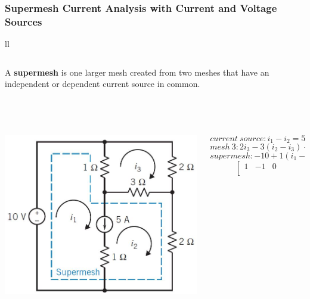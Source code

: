 \documentclass[aspectratio=169]{beamer}
\begin{document}
\begin{frame}[fragile]

\frametitle{Supermesh Current Analysis with Current and Voltage Sources}
\begin{tabular}{ll}
	\begin{columns}[c]	\column{1\textwidth}
		A \textbf{supermesh} is one larger mesh created from two meshes that have an independent or dependent current source in common.
	\end{columns} \\
	\begin{columns}
		\begin{column}{0.3\textwidth}  %
		\includegraphics[width=1.2\textwidth]{figura4_64.JPG}\\	
		\end{column}
		\begin{column}{0.7\textwidth}  %
			\begin{equation}
			current \ source: i_{1}- i_{2}=5
			\end{equation}
			\begin{equation}
			mesh \ 3: 2i_{3}-3(i_{2}-i_{3})-1(i_{1}-i_{3})=0
			\end{equation}
			\begin{equation}
			supermesh: -10 +1(i_{1}-i_{3})+3(i_{2}-i_{3})+2i_{2}=0
			\end{equation}
				\[ 
			\left[\begin{array}{rrr}
			1 & -1 & 0 \\

\end{array}\]
\end{column}
\end{columns}
\end{tabular}
\end{frame}
\end{document}
